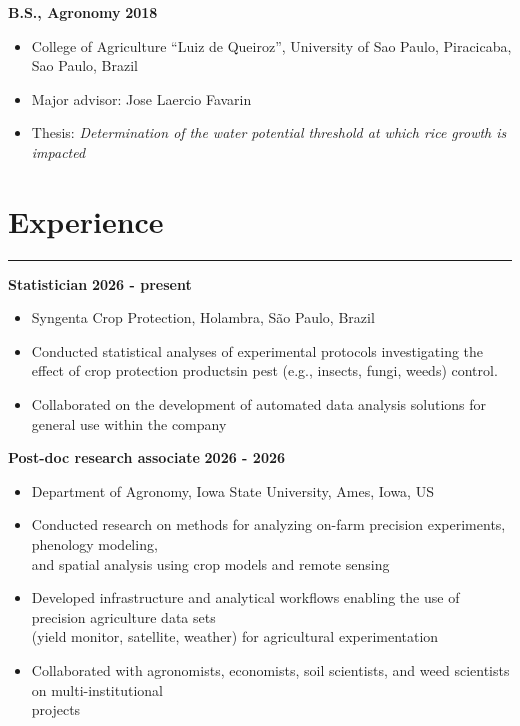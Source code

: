 \documentclass[letterpaper,10pt]{article}
\begin{document}
{\bf B.S., Agronomy \hfill} {\bf 2018}
\vspace{-.08in}
\begin{itemize}
\renewcommand\labelitemi{{\boldmath$\cdot$}}
\itemsep-0.1em
\item 
College of Agriculture ``Luiz de Queiroz'',
University of Sao Paulo, Piracicaba, Sao Paulo, Brazil
\item Major advisor: Jose Laercio Favarin
\item  Thesis: \textit{Determination of the water potential threshold at which rice growth is impacted}
\end{itemize}

\section*{\sc Experience}
\hrule


\vspace{.1in}
{\bf Statistician} \hfill {\bf
2026 - present}
\vspace{-.1in}
\begin{itemize}
\itemsep-0.5em
\renewcommand\labelitemi{{\boldmath$\cdot$}}
\item 
Syngenta Crop Protection, Holambra, São Paulo, Brazil

\item Conducted statistical analyses of experimental protocols investigating
	the effect of crop protection productsin pest (e.g., insects, fungi,
	weeds) control.

\item Collaborated on the development of automated data analysis solutions for general use within the company

	


\end{itemize}

{\bf Post-doc research associate} \hfill {\bf
2026 - 2026}
\vspace{-.1in}
\begin{itemize}
\itemsep-0.5em
\renewcommand\labelitemi{{\boldmath$\cdot$}}
\item 
Department of Agronomy, Iowa State University, Ames, Iowa, US

\item Conducted research on methods for analyzing
	on-farm precision experiments, phenology
	modeling,\\ and spatial analysis using crop
	models and remote sensing
	
\item Developed infrastructure and analytical
	workflows enabling the use of precision
	agriculture
	data sets\\(yield monitor, satellite,
	weather) for agricultural experimentation

\item Collaborated with agronomists, economists, soil
	scientists, and weed scientists on
	multi-institutional\\ projects


\end{itemize}
\end{document}
